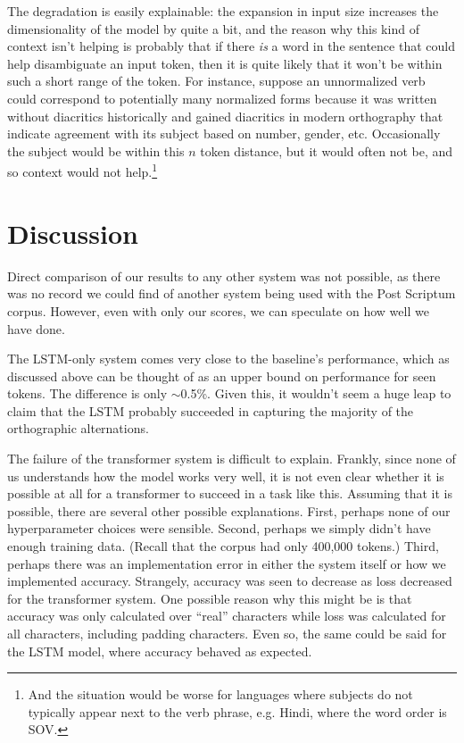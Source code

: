 \documentclass[11pt,a4paper]{article}
\begin{document}
The degradation is easily explainable: the expansion in input size increases the dimensionality of the model by quite a bit, and the reason why this kind of context isn't helping is probably that if there \emph{is} a word in the sentence that could help disambiguate an input token, then it is quite likely that it won't be within such a short range of the token. For instance, suppose an unnormalized verb could correspond to potentially many normalized forms because it was written without diacritics historically and gained diacritics in modern orthography that indicate agreement with its subject based on number, gender, etc. Occasionally the subject would be within this $n$ token distance, but it would often not be, and so context would not help.\footnote{And the situation would be worse for languages where subjects do not typically appear next to the verb phrase, e.g. Hindi, where the word order is SOV.}

\section{Discussion}
Direct comparison of our results to any other system was not possible, as there was no record we could find of another system being used with the Post Scriptum corpus. However, even with only our scores, we can speculate on how well we have done. 

The LSTM-only system comes very close to the baseline’s performance, which as discussed above can be thought of as an upper bound on performance for seen tokens. The difference is only $\sim$0.5\%. Given this, it wouldn't seem a huge leap to claim that the LSTM probably succeeded in capturing the majority of the orthographic alternations.

The failure of the transformer system is difficult to explain. Frankly, since none of us understands how the model works very well, it is not even clear whether it is possible at all for a transformer to succeed in a task like this. Assuming that it is possible, there are several other possible explanations. First, perhaps none of our hyperparameter choices were sensible. Second, perhaps we simply didn't have enough training data. (Recall that the corpus had only 400,000 tokens.) Third, perhaps there was an implementation error in either the system itself or how we implemented accuracy. Strangely, accuracy was seen to decrease as loss decreased for the transformer system. One possible reason why this might be is that accuracy was only calculated over ``real'' characters while loss was calculated for all characters, including padding characters. Even so, the same could be said for the LSTM model, where accuracy behaved as expected. 
\end{document}
